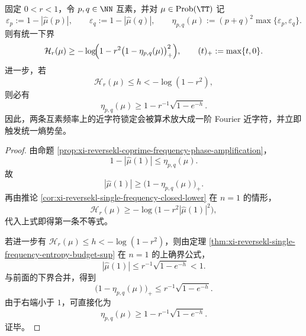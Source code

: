 \begin{theorem}[互素双近字符的一阶熵势垒]\label{thm:conclusion-reversekl-coprime-double-nearchar-entropy-barrier}
固定 \(0<r<1\)，令 \(p,q\in\NN\) 互素，并对 \(\mu\in\mathrm{Prob}(\TT)\) 记
\[
\varepsilon_p:=1-|\widehat\mu(p)|,\qquad
\varepsilon_q:=1-|\widehat\mu(q)|,
\qquad
\eta_{p,q}(\mu):=(p+q)^2\max\{\varepsilon_p,\varepsilon_q\}.
\]
则有统一下界
\[
\mathcal H_r(\mu)\ge -\log\!\Bigl(1-r^2\bigl(1-\eta_{p,q}(\mu)\bigr)_+^2\Bigr),
\qquad
(t)_+:=\max\{t,0\}.
\]
进一步，若
\[
\mathcal H_r(\mu)\le h<-\log(1-r^2),
\]
则必有
\[
\eta_{p,q}(\mu)\ge 1-r^{-1}\sqrt{1-e^{-h}}.
\]
因此，两条互素频率上的近字符锁定会被算术放大成一阶 Fourier 近字符，并立即触发统一熵势垒。
\end{theorem}
\begin{proof}
由命题 \ref{prop:xi-reversekl-coprime-frequency-phase-amplification}，
\[
1-|\widehat\mu(1)|\le \eta_{p,q}(\mu).
\]
故
\[
|\widehat\mu(1)|\ge \bigl(1-\eta_{p,q}(\mu)\bigr)_+.
\]
再由推论 \ref{cor:xi-reversekl-single-frequency-closed-lower} 在 \(n=1\) 的情形，
\[
\mathcal H_r(\mu)\ge -\log\bigl(1-r^2|\widehat\mu(1)|^2\bigr),
\]
代入上式即得第一条不等式。

若进一步有 \(\mathcal H_r(\mu)\le h<-\log(1-r^2)\)，则由定理 \ref{thm:xi-reversekl-single-frequency-entropy-budget-sup} 在 \(n=1\) 的上确界公式，
\[
|\widehat\mu(1)|\le r^{-1}\sqrt{1-e^{-h}}<1.
\]
与前面的下界合并，得到
\[
\bigl(1-\eta_{p,q}(\mu)\bigr)_+\le r^{-1}\sqrt{1-e^{-h}}.
\]
由于右端小于 \(1\)，可直接化为
\[
\eta_{p,q}(\mu)\ge 1-r^{-1}\sqrt{1-e^{-h}}.
\]
证毕。
\end{proof}

